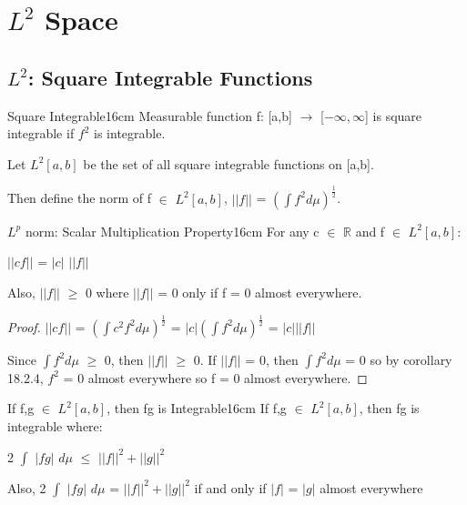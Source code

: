 \newpage

\section[Day 19: $L^2$ Space]{ $L^2$ Space }

\subsection{ $L^2$: Square Integrable Functions }

    \begin{definition}{Square Integrable}{16cm}
        Measurable function f: [a,b] $\rightarrow$ [$-\infty,\infty$]
        is {\color{lblue} square integrable} if $f^2$ is integrable.

        Let $L^2[a,b]$ be the set of all square integrable functions on [a,b].
        
        Then define the norm of f $\in$ $L^2[a,b]$,
        $||f||$ = $(\int f^2 d\mu)^{\frac{1}{2}}$.
    \end{definition}

    \vspace{0.5cm}



    \begin{wtheorem}{$L^p$ norm: Scalar Multiplication Property}{16cm}
        For any c $\in$ $\mathbb{R}$ and f $\in$ $L^2[a,b]$:

        \hspace{0.5cm}
        $||cf||$ = $|c|$ $||f||$

        Also, $||f||$ $\geq$ 0 where $||f||$ = 0 only if f = 0 almost everywhere.
    \end{wtheorem}

    \begin{proof}
        $||cf||$
        = $(\int c^2f^2 d\mu)^{\frac{1}{2}}$
        = $|c| (\int f^2 d\mu)^{\frac{1}{2}}$
        = $|c| ||f||$

        Since $\int f^2 d\mu$ $\geq$ 0, then $||f||$ $\geq$ 0.
        If $||f||$ = 0, then $\int f^2 d\mu$ = 0
        so by {\color{orange} corollary 18.2.4}, $f^2$ = 0 almost
        everywhere so f = 0 almost everywhere.
    \end{proof}

    \vspace{0.5cm}



    \begin{wtheorem}{If f,g $\in$ $L^2[a,b]$, then fg is Integrable}{16cm}
        If f,g $\in$ $L^2[a,b]$, then fg is integrable where:

        \hspace{0.5cm}
        2 $\int$ $|fg|$ $d\mu$ $\leq$ $||f||^2 + ||g||^2$

        Also, 2 $\int$ $|fg|$ $d\mu$ = $||f||^2 + ||g||^2$
        if and only if $|f|$ = $|g|$ almost everywhere
    \end{wtheorem}

